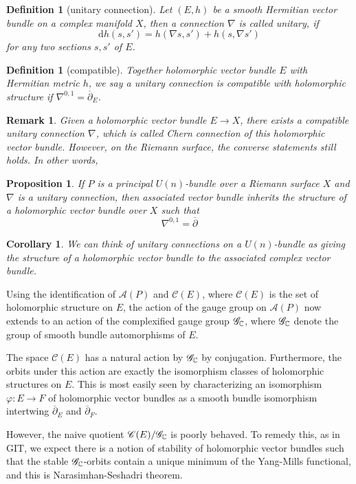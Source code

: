 \documentclass[11pt]{amsart}
\numberwithin{equation}{section}
\theoremstyle{plain}
\theoremstyle{plain}
\newtheorem{corsub}[thmsub]{Corollary}
\newtheorem{propsub}[thmsub]{Proposition}
\newtheorem{defnsub}[thmsub]{Definition}
\newtheorem{remksub}[thmsub]{Remark}
\numberwithin{equation}{section}
\begin{document}
\begin{defnsub}[unitary connection]
Let $(E,h)$ be a smooth Hermitian vector bundle on a complex manifold $X$, then a connection $\nabla$ is called unitary, if
$$
\mathrm{d}h(s,s')=h(\nabla s,s')+h(s,\nabla s')
$$
for any two sections $s,s'$ of $E$.
\end{defnsub}
\begin{defnsub}[compatible]
Together holomorphic vector bundle $E$ with Hermitian metric $h$, we say a unitary connection is compatible with holomorphic structure if $\nabla^{0,1}=\overline{\partial}_E$.
\end{defnsub}
\begin{remksub}\normalfont
Given a holomorphic vector bundle $E\to X$, there exists a compatible unitary connection $\nabla$, which is called Chern connection of this holomorphic vector bundle. However, on the Riemann surface, the converse statements still holds. In other words,
\end{remksub}

\begin{propsub}
If $P$ is a principal $U(n)$-bundle over a Riemann surface $X$ and $\nabla$ is a unitary connection, then associated vector bundle inherits the structure of a holomorphic vector bundle over $X$ such that 
$$
\nabla^{0,1}=\overline{\partial}
$$
\end{propsub}
\begin{corsub}
We can think of unitary connections on a $U(n)$-bundle as giving the structure of a holomorphic vector bundle to the associated complex vector bundle.
\end{corsub}

Using the identification of $\mathscr{A}(P)$ and $\mathscr{C}(E)$, where $\mathscr{C}(E)$ is the set of holomorphic structure on $E$, the action of the gauge group on $\mathscr{A}(P)$ now extends to an action of the complexified gauge group $\mathscr{G}_{\Bbb{C}}$, where $\mathscr{G}_{\Bbb{C}}$ denote the group of smooth bundle automorphisms of $E$. 

The space $\mathscr{C}(E)$ has a natural action by $\mathscr{G}_{\Bbb{C}}$ by conjugation. Furthermore, the orbits under this action are exactly the isomorphism classes of holomorphic structures on $E$. This is most easily seen by characterizing an isomorphism $\varphi:E\to F$ of holomorphic vector bundles as a smooth bundle isomorphism intertwing $\overline{\partial}_E$ and $\overline{\partial}_F$. 

However, the naive  quotient $\mathscr{C}(E)/\mathscr{G}_{\Bbb{C}}$ is poorly behaved. To remedy this, as in GIT, we expect there is a notion of stability of holomorphic vector bundles such that the stable $\mathscr{G}_{\Bbb{C}}$-orbits contain a unique minimum of the Yang-Mills functional, and this is Narasimhan-Seshadri theorem.
\end{document}
